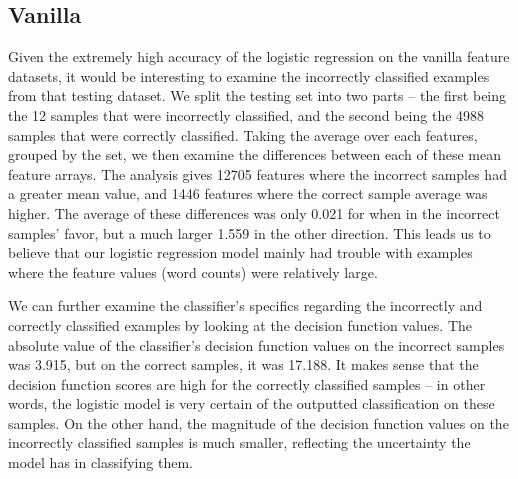 \documentclass{article} %
\begin{document}
\subsection{Vanilla}
Given the extremely high accuracy of the logistic regression on the vanilla feature datasets, it would be interesting to examine the incorrectly classified examples from that testing dataset.  We split the testing set into two parts -- the first being the 12 samples that were incorrectly classified, and the second being the 4988 samples that were correctly classified.  Taking the average over each features, grouped by the set, we then examine the differences between each of these mean feature arrays.  The analysis gives 12705 features where the incorrect samples had a greater mean value, and 1446 features where the correct sample average was higher.  The average of these differences was only 0.021 for when in the incorrect samples' favor, but a much larger 1.559 in the other direction.  This leads us to believe that our logistic regression model mainly had trouble with examples where the feature values (word counts) were relatively large.\par 
We can further examine the classifier's specifics regarding the incorrectly and correctly classified examples by looking at the decision function values.  The absolute value of the classifier's decision function values on the incorrect samples was 3.915, but on the correct samples, it was 17.188.  It makes sense that the decision function scores are high for the correctly classified samples -- in other words, the logistic model is very certain of the outputted classification on these samples.  On the other hand, the magnitude of the decision function values on the incorrectly classified samples is much smaller, reflecting the uncertainty the model has in classifying them. \cite{zhu2009}\par
\end{document}
